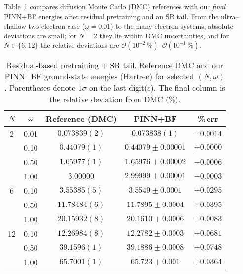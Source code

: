Table~\ref{tab:energies} compares diffusion Monte Carlo (DMC) references with our \emph{final} PINN+BF energies after residual pretraining and an SR tail. From the ultra–shallow two-electron case ($\omega{=}0.01$) to the many-electron systems, absolute deviations are small; for $N{=}2$ they lie within DMC uncertainties, and for $N\!\in\!\{6,12\}$ the relative deviations are $\mathcal{O}(10^{-2}\,\%)$–$\mathcal{O}(10^{-1}\,\%)$.

\begin{table}[htbp]
  \centering
  \caption{Residual-based pretraining + SR tail. Reference DMC and our PINN+BF ground-state energies (Hartree) for selected $(N,\omega)$. Parentheses denote $1\sigma$ on the last digit(s). The final column is the relative deviation from DMC (\%).}
  \label{tab:energies}
  \begin{threeparttable}
    \begin{tabular}{c|c|ccc}
      \toprule
      $N$ & $\omega$ & Reference (DMC) & PINN+BF & \%\,err \\
      \midrule
      2 & 0.01 & $0.073839(2)$ & $0.073838(1)$ & $-0.0014$ \\
        & 0.10 & $0.44079(1)$  & $0.44079 \pm 0.00001$ & $+0.0000$ \\
        & 0.50 & $1.65977(1)$  & $1.65976 \pm 0.00002$ & $-0.0006$ \\
        & 1.00 & $3.00000$     & $2.99999 \pm 0.00001$ & $-0.0003$ \\
      \midrule
      6 & 0.10 & $3.55385(5)$  & $3.5549 \pm 0.0001$ & $+0.0295$ \\
        & 0.50 & $11.78484(6)$ & $11.7895 \pm 0.0004$ & $+0.0395$ \\
        & 1.00 & $20.15932(8)$ & $20.1610 \pm 0.0006$ & $+0.0083$ \\
      \midrule
      12 & 0.10 & $12.26984(8)$ & $12.2782 \pm 0.0003$ & $+0.0681$ \\
         & 0.50 & $39.1596(1)$  & $39.1886 \pm 0.0008$ & $+0.0748$ \\
         & 1.00 & $65.7001(1)$  & $65.723 \pm 0.001$   & $+0.0364$ \\
      \bottomrule
    \end{tabular}
  \end{threeparttable}
\end{table}

